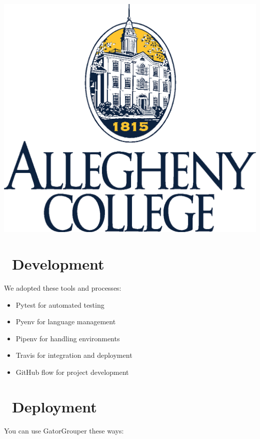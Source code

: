 \documentclass[a0paper,fleqn]{betterposter}
\begin{document}
{  %
  \vfill

  \includegraphics[width=\textwidth]{img/CollegeLogo.eps}\\

  }{


  \vspace*{-.5in}
  \section{\faCodeFork~Development}
  We adopted these tools and processes:\\
  \vspace*{-.5in}
  \begin{itemize}[leftmargin=*]

    \item{Pytest for automated testing}
    \item{Pyenv for language management}
    \item{Pipenv for handling environments}
    \item{Travis for integration and deployment}
    \item{GitHub flow for project development}

  \end{itemize}

  \section{\faCloudUpload~Deployment}
  You can use GatorGrouper these ways:\\
  \vspace*{-.5in}
  \begin{itemize}[leftmargin=*]


\end{itemize}}
\end{document}
